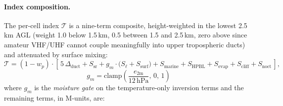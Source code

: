 \documentclass[11pt,a4paper]{article}
\newcommand{\SI}[2]{#1\,\text{#2}}
\begin{document}
\paragraph{Index composition.} The per-cell index $\mathcal{T}$ is
a nine-term composite, height-weighted in the lowest 2.5\,km AGL
(weight 1.0 below 1.5\,km, 0.5 between 1.5 and 2.5\,km, zero above
since amateur VHF/UHF cannot couple meaningfully into upper
tropospheric ducts) and attenuated by surface mixing:
\begin{equation}\label{eq:tropoindex}
  \mathcal{T} = (1 - w_p) \cdot \!\left[\,
    5\,\Delta_{\text{duct}}
    + S_{\text{sr}}
    + g_m \cdot \bigl(S_{\ell}
    + S_{\text{surf}}\bigr)
    + S_{\text{marine}}
    + S_{\text{HPBL}}
    + S_{\text{evap}}
    + S_{\text{cliff}}
    + S_{\text{noct}}
  \,\right],
\end{equation}
\begin{equation*}
  g_m = \mathrm{clamp}\!\left(\frac{e_{2\text{m}}}
    {\SI{12}{hPa}},\, 0,\, 1\right)
\end{equation*}
where $g_m$ is the \emph{moisture gate} on the temperature-only
inversion terms and the remaining terms, in M-units, are:
\end{document}
